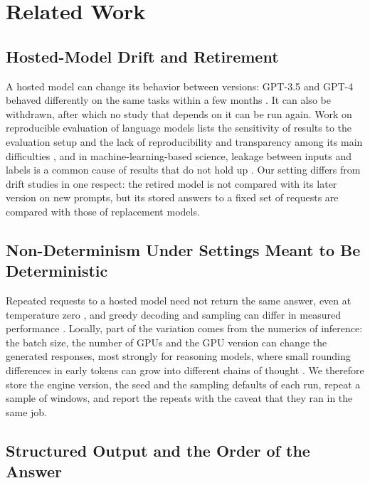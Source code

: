 \section{Related Work}
\label{sec:background}

\subsection{Hosted-Model Drift and Retirement}
\label{sec:background:drift}

A hosted model can change its behavior between versions: GPT-3.5 and GPT-4 behaved differently on the same tasks within a few months \cite{chen2024chatgpt}. It can also be withdrawn, after which no study that depends on it can be run again. Work on reproducible evaluation of language models lists the sensitivity of results to the evaluation setup and the lack of reproducibility and transparency among its main difficulties \cite{biderman2024lessons}, and in machine-learning-based science, leakage between inputs and labels is a common cause of results that do not hold up \cite{kapoor2023leakage}. Our setting differs from drift studies in one respect: the retired model is not compared with its later version on new prompts, but its stored answers to a fixed set of requests are compared with those of replacement models.

\subsection{Non-Determinism Under Settings Meant to Be Deterministic}
\label{sec:background:nondeterminism}

Repeated requests to a hosted model need not return the same answer, even at temperature zero \cite{atil2025nondeterminism,ouyang2025nondeterminism}, and greedy decoding and sampling can differ in measured performance \cite{song2025greedy}. Locally, part of the variation comes from the numerics of inference: the batch size, the number of GPUs and the GPU version can change the generated responses, most strongly for reasoning models, where small rounding differences in early tokens can grow into different chains of thought \cite{yuan2025nondeterminism}. We therefore store the engine version, the seed and the sampling defaults of each run, repeat a sample of windows, and report the repeats with the caveat that they ran in the same job.

\subsection{Structured Output and the Order of the Answer}
\label{sec:background:structured}

